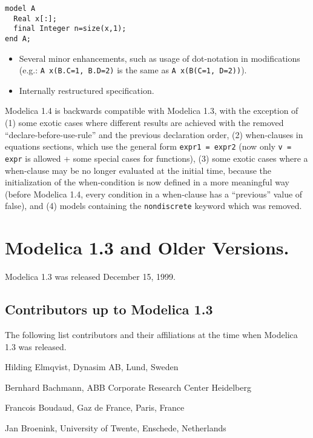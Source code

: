 \begin{lstlisting}[language=modelica]
model A
  Real x[:];
  final Integer n=size(x,1);
end A;
\end{lstlisting}

\begin{itemize}
\item
  Several minor enhancements, such as usage of dot-notation in
  modifications\\
  (e.g.: \lstinline!A x(B.C=1, B.D=2)! is the same as \lstinline!A x(B(C=1, D=2))!).
\item
  Internally restructured specification.
\end{itemize}

Modelica 1.4 is backwards compatible with Modelica 1.3, with the exception of (1) some exotic cases where different results are achieved with the removed ``declare-before-use-rule'' and the previous declaration order, (2) when-clauses in equations sections, which use the general form \lstinline!expr1 = expr2! (now only \lstinline!v = expr! is allowed + some special cases for functions), (3) some exotic cases where a when-clause may be no longer evaluated at the initial time, because the initialization of the when-condition is now defined in a more meaningful way (before Modelica 1.4, every condition in a when-clause has a ``previous'' value of false), and (4) models containing the \lstinline!nondiscrete! keyword which was removed.

\section{Modelica 1.3 and Older Versions.}\label{modelica-1-3-and-older-versions}

Modelica 1.3 was released December 15, 1999.

\subsection{Contributors up to Modelica 1.3}\label{contributors-up-to-modelica-1-3}
The following list contributors and their affiliations at the time when
Modelica 1.3 was released.

Hilding Elmqvist, Dynasim AB, Lund, Sweden

Bernhard Bachmann, ABB Corporate Research Center Heidelberg

Francois Boudaud, Gaz de France, Paris, France

Jan Broenink, University of Twente, Enschede, Netherlands

